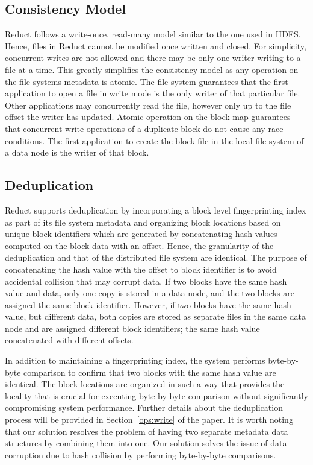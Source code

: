\documentclass[11pt,twocolumn]{article}
\begin{document}
\subsection{Consistency Model}\label{arch:cons}
Reduct follows a write-once, read-many model similar to the one used in HDFS. Hence, files in Reduct cannot be modified once written and closed. For simplicity, concurrent writes are not allowed and there may be only one writer writing to a file at a time. This greatly simplifies the consistency model as any operation on the file systems metadata is atomic. The file system guarantees that the first application to open a file in write mode is the only writer of that particular file. Other applications may concurrently read the file, however only up to the file offset the writer has updated. Atomic operation on the block map guarantees that concurrent write operations of a duplicate block do not cause any race conditions. The first application to create the block file in the local file system of a data node is the writer of that block.


\subsection{Deduplication}\label{arch:dedup}
Reduct supports deduplication by incorporating a block level fingerprinting index as part of its file system metadata and organizing block locations based on unique block identifiers which are generated by concatenating hash values computed on the block data with an offset. Hence, the granularity of the deduplication and that of the distributed file system are identical. The purpose of concatenating the hash value with the offset to block identifier is to avoid accidental collision that may corrupt data. If two blocks have the same hash value and data, only one copy is stored in a data node, and the two blocks are assigned the same block identifier. However, if two blocks have the same hash value, but different data, both copies are stored as separate files in the same data node and are assigned different block identifiers; the same hash value concatenated with different offsets. 

In addition to maintaining a fingerprinting index, the system performs byte-by-byte comparison to confirm that two blocks with the same hash value are identical. The block locations are organized in such a way that provides the locality that is crucial for executing byte-by-byte comparison without significantly compromising system performance. Further details about the deduplication process will be provided in Section~\ref{ops:write} of the paper. It is worth noting that our solution resolves the problem of having two separate metadata data structures by combining them into one.  Our solution solves the issue of data corruption due to hash collision by performing byte-by-byte comparisons.
\end{document}
